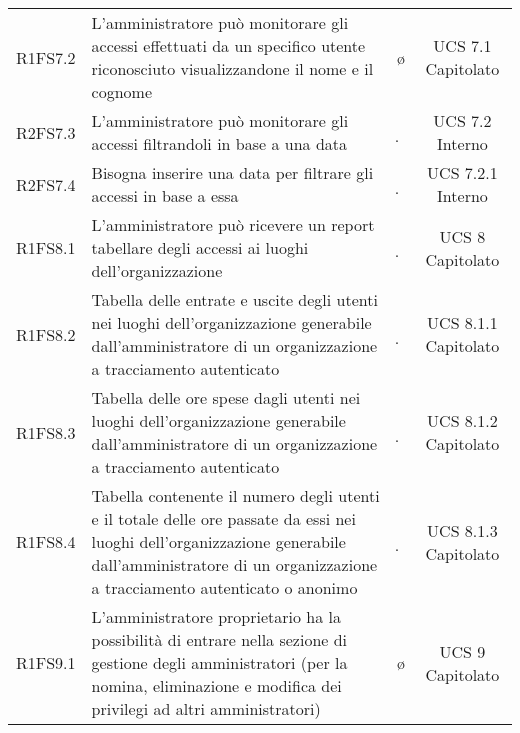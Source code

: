 {\begin{longtable}{ c C{4cm} c c}
R1FS7.2 & L'amministratore può monitorare gli accessi effettuati da un specifico utente riconosciuto visualizzandone il nome e il cognome & \o & UCS 7.1 Capitolato\\
R2FS7.3 & L'amministratore può monitorare gli accessi filtrandoli in base a una data & \d & UCS 7.2 Interno\\
R2FS7.4 & Bisogna inserire una data per filtrare gli accessi in base a essa & \d & UCS 7.2.1 Interno\\
R1FS8.1 & L'amministratore può ricevere un report tabellare degli accessi ai luoghi dell'organizzazione & \d & UCS 8 Capitolato\\
R1FS8.2 &  Tabella delle entrate e uscite degli utenti nei luoghi dell'organizzazione generabile dall'amministratore di un organizzazione a tracciamento autenticato & \d & UCS 8.1.1 Capitolato\\
R1FS8.3 & Tabella delle ore spese dagli utenti nei luoghi dell'organizzazione generabile dall'amministratore di un organizzazione a tracciamento autenticato & \d & UCS 8.1.2 Capitolato\\
R1FS8.4 & Tabella contenente il numero degli utenti e il totale delle ore passate da essi nei luoghi dell'organizzazione generabile dall'amministratore di un organizzazione a tracciamento autenticato o anonimo & \d & UCS 8.1.3 Capitolato\\



R1FS9.1 & L'amministratore proprietario ha la possibilità di entrare nella sezione di gestione degli amministratori (per la nomina, eliminazione e modifica dei privilegi ad altri amministratori) & \o & UCS 9 Capitolato \\


\end{longtable}}
